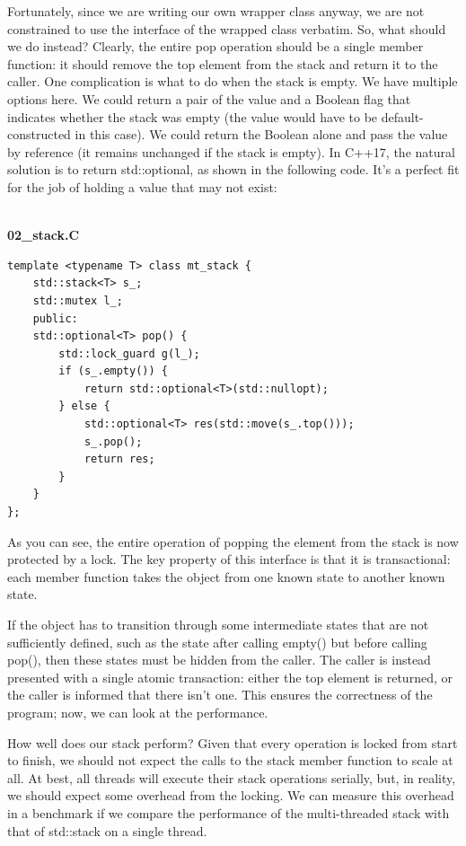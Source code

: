 Fortunately, since we are writing our own wrapper class anyway, we are not constrained to use the interface of the wrapped class verbatim. So, what should we do instead? Clearly, the entire pop operation should be a single member function: it should remove the top element from the stack and return it to the caller. One complication is what to do when the stack is empty. We have multiple options here. We could return a pair of the value and a Boolean flag that indicates whether the stack was empty (the value would have to be default-constructed in this case). We could return the Boolean alone and pass the value by reference (it remains unchanged if the stack is empty). In C++17, the natural solution is to return std::optional, as shown in the following code. It's a perfect fit for the job of holding a value that may not exist:

\hspace*{\fill} \\ %
\noindent
\textbf{02\_stack.C}
\begin{lstlisting}[style=styleCXX]
template <typename T> class mt_stack {
	std::stack<T> s_;
	std::mutex l_;
	public:
	std::optional<T> pop() {
		std::lock_guard g(l_);
		if (s_.empty()) {
			return std::optional<T>(std::nullopt);
		} else {
			std::optional<T> res(std::move(s_.top()));
			s_.pop();
			return res;
		}
	}
};
\end{lstlisting}

As you can see, the entire operation of popping the element from the stack is now protected by a lock. The key property of this interface is that it is transactional: each member function takes the object from one known state to another known state.

If the object has to transition through some intermediate states that are not sufficiently defined, such as the state after calling empty() but before calling pop(), then these states must be hidden from the caller. The caller is instead presented with a single atomic transaction: either the top element is returned, or the caller is informed that there isn't one. This ensures the correctness of the program; now, we can look at the performance.


How well does our stack perform? Given that every operation is locked from start to finish, we should not expect the calls to the stack member function to scale at all. At best, all threads will execute their stack operations serially, but, in reality, we should expect some overhead from the locking. We can measure this overhead in a benchmark if we compare the performance of the multi-threaded stack with that of std::stack on a single thread.


